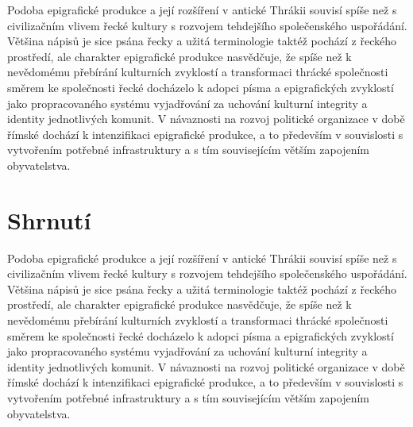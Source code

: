 Podoba epigrafické produkce a její rozšíření v antické Thrákii souvisí spíše než s civilizačním vlivem řecké kultury s rozvojem tehdejšího společenského uspořádání. Většina nápisů je sice psána řecky a užitá terminologie taktéž pochází z řeckého prostředí, ale charakter epigrafické produkce nasvědčuje, že spíše než k nevědomému přebírání kulturních zvyklostí a transformaci thrácké společnosti směrem ke společnosti řecké docházelo k adopci písma a epigrafických zvyklostí jako propracovaného systému vyjadřování za uchování kulturní integrity a identity jednotlivých komunit. V návaznosti na rozvoj politické organizace v době římské dochází k intenzifikaci epigrafické produkce, a to především v souvislosti s vytvořením potřebné infrastruktury a s tím souvisejícím větším zapojením obyvatelstva.
\section[shrnutí-26]{Shrnutí}

Podoba epigrafické produkce a její rozšíření v antické Thrákii souvisí spíše než s civilizačním vlivem řecké kultury s rozvojem tehdejšího společenského uspořádání. Většina nápisů je sice psána řecky a užitá terminologie taktéž pochází z řeckého prostředí, ale charakter epigrafické produkce nasvědčuje, že spíše než k nevědomému přebírání kulturních zvyklostí a transformaci thrácké společnosti směrem ke společnosti řecké docházelo k adopci písma a epigrafických zvyklostí jako propracovaného systému vyjadřování za uchování kulturní integrity a identity jednotlivých komunit. V návaznosti na rozvoj politické organizace v době římské dochází k intenzifikaci epigrafické produkce, a to především v souvislosti s vytvořením potřebné infrastruktury a s tím souvisejícím větším zapojením obyvatelstva.
